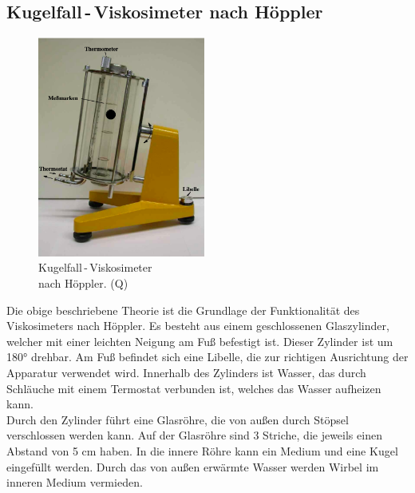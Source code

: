         \subsection{Kugelfall\,-\,Viskosimeter nach Höppler}
            \begin{figure}
                \begin{center}
                    \includegraphics[width=5.5cm]{content/Viskosimeter.png}
                    \caption[width=5.5cm]{Kugelfall\,-\,Viskosimeter\\nach Höppler. (Q\cite{anleitungV207})}
                \end{center}
                
                \label{fig:Kugelfallviskosimeter}
            \end{figure}
            Die obige beschriebene Theorie ist die Grundlage der Funktionalität des Viskosimeters 
            nach Höppler. Es besteht aus einem geschlossenen Glaszylinder, 
            welcher mit einer leichten Neigung am Fuß befestigt
            ist. Dieser Zylinder ist um 180° drehbar. Am Fuß befindet sich eine Libelle, die zur 
            richtigen Ausrichtung der Apparatur verwendet wird. 
            Innerhalb des Zylinders ist Wasser, das durch Schläuche mit einem Termostat verbunden ist,
            welches das Wasser aufheizen kann. \\
            Durch den Zylinder führt eine Glasröhre, die von außen durch Stöpsel 
            verschlossen werden kann. Auf der Glasröhre sind 3 Striche, die jeweils 
            einen Abstand von 5 \unit{\centi\meter} haben. In die innere Röhre kann
            ein Medium und eine Kugel eingefüllt werden. Durch das von außen erwärmte Wasser werden Wirbel im inneren Medium vermieden. 
